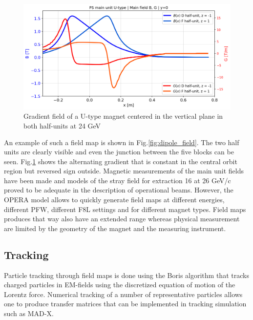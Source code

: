 \documentclass[a4paper,
               biblatex,     %
               keeplastbox,   %
               ]{jacow}
\begin{document}

\begin{figure}[!htb]
   \centering
   \includegraphics*[width=1.0\columnwidth, trim={0 0 0 0cm},clip]{Main_field_B_G.png}
   \caption{Gradient field of a U-type magnet centered in the vertical plane in both half-units at 24 GeV}
   \label{fig:gradient_field}
\end{figure}

An example of such a field map is shown in Fig.\ref{fig:dipole_field}. The two half units are clearly visible and even the junction between the five blocks can be seen. Fig.\ref{fig:gradient_field} shows the alternating gradient that is constant in the central orbit region but reversed sign outside. Magnetic measurements of the main unit fields have been made \cite{manglunki_beam_1997} and models of the stray field for extraction 16 at 26 GeV/c proved to be adequate in the description of operational beams. However, the OPERA model allows to quickly generate field maps at different energies, different PFW, different F8L settings and for different magnet types. Field maps produces that way also have an extended range whereas physical measurement are limited by the geometry of the magnet and the measuring instrument.

\subsection{Tracking}
Particle tracking through field maps is done using the Boris algorithm that tracks charged particles in EM-fields using the discretized equation of motion of the Lorentz force\cite{qin_why_2013}\cite{ripperda_comprehensive_2018}. Numerical tracking of a number of representative particles allows one to produce transfer matrices that can be implemented in tracking simulation such as MAD-X.\cite{yoon_method_2013}
\end{document}
